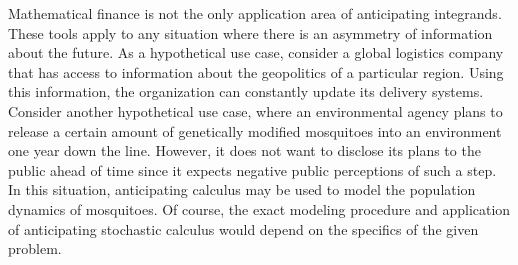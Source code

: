 Mathematical finance is not the only application area of anticipating integrands. These tools apply to any situation where there is an asymmetry of information about the future. As a hypothetical use case, consider a global logistics company that has access to information about the geopolitics of a particular region. Using this information, the organization can constantly update its delivery systems. Consider another hypothetical use case, where an environmental agency plans to release a certain amount of genetically modified mosquitoes into an environment one year down the line. However, it does not want to disclose its plans to the public ahead of time since it expects negative public perceptions of such a step. In this situation, anticipating calculus may be used to model the population dynamics of mosquitoes. Of course, the exact modeling procedure and application of anticipating stochastic calculus would depend on the specifics of the given problem.
